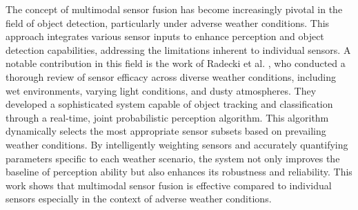 \documentclass[report.tex]{subfiles}
\begin{document}
        
  
  



    The concept of multimodal sensor fusion has become increasingly pivotal in the field of object detection, particularly under adverse weather conditions. This approach integrates various sensor inputs to enhance perception and object detection capabilities, addressing the limitations inherent to individual sensors. A notable contribution in this field is the work of Radecki et al. \cite{radecki2016all}, who conducted a thorough review of sensor efficacy across diverse weather conditions, including wet environments, varying light conditions, and dusty atmospheres. They developed a sophisticated system capable of object tracking and classification through a real-time, joint probabilistic perception algorithm. This algorithm dynamically selects the most appropriate sensor subsets based on prevailing weather conditions. By intelligently weighting sensors and accurately quantifying parameters specific to each weather scenario, the system not only improves the baseline of perception ability but also enhances its robustness and reliability. This work shows that multimodal sensor fusion is effective compared to individual sensors especially in the context of adverse weather conditions. 
\end{document}
